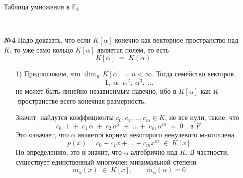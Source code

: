 \documentclass[a4paper]{article}
\begin{document}
\begin{enumerate}
  Таблица умножения в $\mathbb{F}_8$

  \\

  \item[\textbf{№4}]Надо доказать, что если $K[\alpha]$ конечно как 
  векторное пространство над $K$, то уже само кольцо $K[\alpha]$ является полем,
  то есть
  $$
  K[\alpha] \;=\; K(\alpha)
  $$
  \begin{enumerate}
    \item[1)]
    Предположим, что $\dim_K K[\alpha] = n < \infty.$ Тогда семейство векторов
    $$
    1,\;\alpha,\;\alpha^2,\;\alpha^3,\;\dots
    $$
    не может быть линейно независимым навечно, ибо в $K[\alpha]$ как $K$-пространстве
    всего конечная размерность. 

    Значит, найдутся коэффициенты $c_0,c_1,\dots,c_m\in K$, не все нули, такие, что
    $$
    c_0\cdot1 \;+\; c_1\,\alpha \;+\; c_2\,\alpha^2 \;+\;\dots+\;c_m\,\alpha^m \;=\; 0
    \quad\text{в }F.
    $$
    Это означает, что $\alpha$ является корнем некоторого ненулевого многочлена
    $$
    p(x) = c_0 + c_1 x + \dots + c_m x^m \;\in\; K[x]
    $$
    По определению, это и значит, что $\alpha$ алгебрично над $K$. В частности, 
    существует единственный многочлен минимальной степени
    $$
    m_\alpha(x)\;\in\;K[x],\qquad m_\alpha(\alpha)=0
    $$


\end{enumerate}
\end{enumerate}
\end{document}
